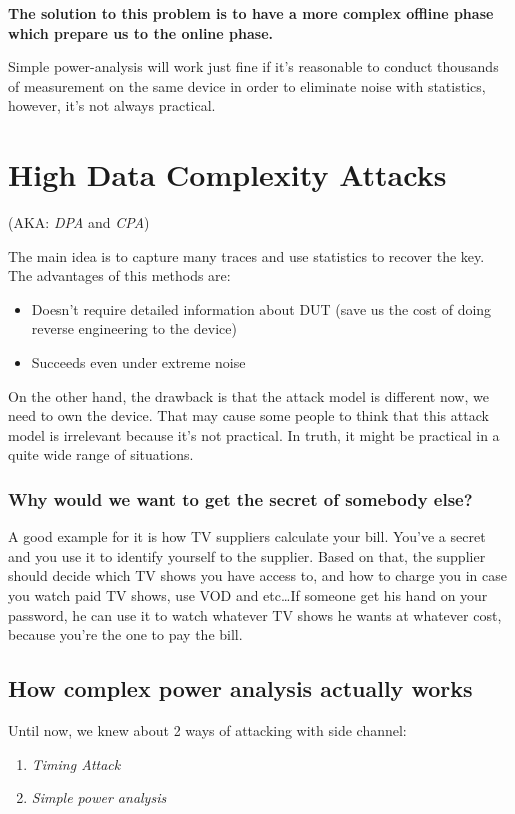\textbf{The solution to this problem is to have a more complex offline phase which prepare us to the online phase.}

Simple power-analysis will work just fine if it's reasonable to conduct
thousands of measurement on the same device in order to eliminate noise with
statistics, however, it's not always practical.

\section{High Data Complexity Attacks}

(AKA: \textit{DPA} and \textit{CPA})

The main idea is to capture many traces and use statistics to recover the key.
The advantages of this methods are:
\begin{itemize}
    \item Doesn't require detailed information about DUT (save us the cost of
    doing reverse engineering to the device)
    \item Succeeds even under extreme noise
\end{itemize}

On the other hand, the drawback is that the attack model is different now, we
need to own the device. That may cause some people to think that this attack
model is irrelevant because it's not practical. In truth, it might be practical
in a quite wide range of situations.

\subsubsection{Why would we want to get the secret of somebody else?}

A good example for it is how TV suppliers calculate your bill. You've a secret
and you use it to identify yourself to the supplier. Based on that, the supplier
should decide which TV shows you have access to, and how to charge you in case
you watch paid TV shows, use VOD and etc\ldots If someone get his hand on your
password, he can use it to watch whatever TV shows he wants at whatever cost,
because you're the one to pay the bill.

\subsection{How complex power analysis actually works}

Until now, we knew about 2 ways of attacking with side channel:
\begin{enumerate}
    \item \textit{Timing Attack}
    \item \textit{Simple power analysis}
\end{enumerate}


